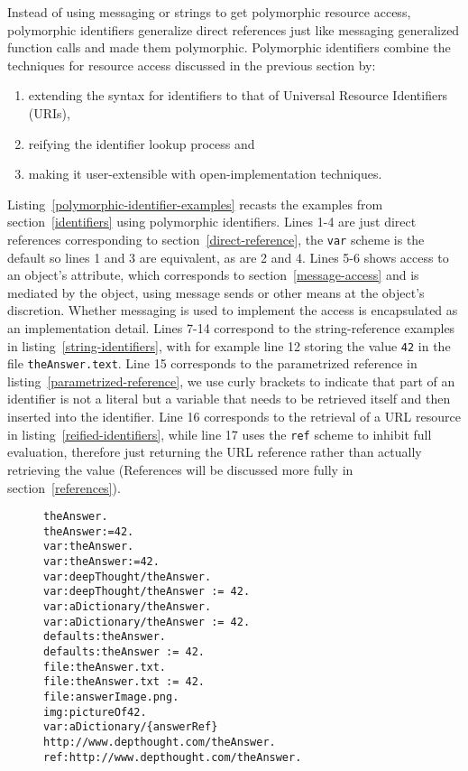 \documentclass[preprint,authoryear]{acm_proc_article-sp}
\begin{document}
Instead of using messaging or strings to get polymorphic resource access, polymorphic identifiers
generalize direct references  just like messaging generalized function calls and made them polymorphic.
Polymorphic identifiers combine the techniques for resource access discussed in the previous 
section by:
\begin{enumerate}
\item extending the syntax for identifiers to that of Universal Resource Identifiers (URIs)\cite{rfc3986},
\item reifying the identifier lookup process and
\item making it user-extensible with open-implementation techniques.
\end{enumerate}

Listing~\ref{polymorphic-identifier-examples} recasts the examples from section~\ref{identifiers} using
polymorphic identifiers.  Lines 1-4 are just direct references corresponding to section~\ref{direct-reference},
the {\tt var} scheme is the default so lines 1 and 3 are equivalent, as are 2 and 4.
Lines 5-6 shows access to an object's attribute, which corresponds to section~\ref{message-access} and is
mediated by the object, using message sends or other means at the object's discretion.  Whether messaging
is used to implement the access is encapsulated as an implementation detail.  Lines 7-14 correspond
to the string-reference examples in listing~\ref{string-identifiers}, with for example line 12 storing the
value {\tt 42} in the file {\tt theAnswer.text}.  Line 15 corresponds to the parametrized reference in listing~\ref{parametrized-reference}, we use curly brackets to indicate that part of an identifier is not a literal but
a variable that needs to be retrieved itself and then inserted into the identifier.  Line 16 corresponds to the retrieval of a URL resource in listing~\ref{reified-identifiers}, while line 17 uses the {\tt ref} scheme to inhibit full evaluation, therefore just returning the
URL reference rather than actually retrieving the value (References will be discussed more fully in section~\ref{references}).

\begin{figure}[htbp]
\begin{lstlisting}[style=numbers,label=polymorphic-identifier-examples,caption=Some variants of polymorphic identifiers.]
theAnswer.
theAnswer:=42.
var:theAnswer.
var:theAnswer:=42.
var:deepThought/theAnswer.
var:deepThought/theAnswer := 42.
var:aDictionary/theAnswer.
var:aDictionary/theAnswer := 42.
defaults:theAnswer.
defaults:theAnswer := 42.
file:theAnswer.txt.
file:theAnswer.txt := 42.
file:answerImage.png.
img:pictureOf42.
var:aDictionary/{answerRef}
http://www.depthought.com/theAnswer.
ref:http://www.depthought.com/theAnswer.
\end{lstlisting}
\end{figure}
\end{document}
